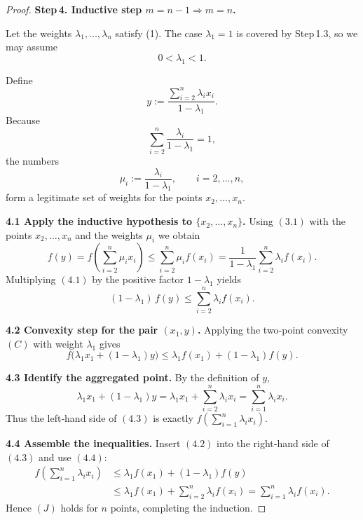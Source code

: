 \begin{proof}
\bigskip

\textbf{Step 4. Inductive step \(m=n-1\Longrightarrow m=n\).}  

Let the weights \(\lambda_{1},\dots ,\lambda_{n}\) satisfy (1).  
The case \(\lambda_{1}=1\) is covered by Step 1.3, so we may assume
\[
0<\lambda_{1}<1 .
\]

Define
\[
y:=\frac{\displaystyle\sum_{i=2}^{n}\lambda_{i}x_{i}}{1-\lambda_{1}} .
\]
Because
\[
\sum_{i=2}^{n}\frac{\lambda_{i}}{1-\lambda_{1}}=1,
\]
the numbers
\[
\mu_{i}:=\frac{\lambda_{i}}{1-\lambda_{1}},\qquad i=2,\dots ,n,
\]
form a legitimate set of weights for the points \(x_{2},\dots ,x_{n}\).

\medskip

\textbf{4.1 Apply the inductive hypothesis to \(\{x_{2},\dots ,x_{n}\}\).}  
Using \((3.1)\) with the points \(x_{2},\dots ,x_{n}\) and the weights \(\mu_{i}\) we obtain
\begin{equation*}
f(y)=f\!\left(\sum_{i=2}^{n}\mu_{i}x_{i}\right)
\le \sum_{i=2}^{n}\mu_{i}f(x_{i})
 =\frac{1}{1-\lambda_{1}}\sum_{i=2}^{n}\lambda_{i}f(x_{i}). \tag{4.1}
\end{equation*}
Multiplying \((4.1)\) by the positive factor \(1-\lambda_{1}\) yields
\begin{equation*}
(1-\lambda_{1})\,f(y)\le\sum_{i=2}^{n}\lambda_{i}f(x_{i}). \tag{4.2}
\end{equation*}

\medskip

\textbf{4.2 Convexity step for the pair \((x_{1},y)\).}  
Applying the two‑point convexity \((C)\) with weight \(\lambda_{1}\) gives
\begin{equation*}
f\bigl(\lambda_{1}x_{1}+(1-\lambda_{1})y\bigr)
\le \lambda_{1}f(x_{1})+(1-\lambda_{1})f(y). \tag{4.3}
\end{equation*}

\medskip

\textbf{4.3 Identify the aggregated point.}  
By the definition of \(y\),
\begin{equation*}
\lambda_{1}x_{1}+(1-\lambda_{1})y
=\lambda_{1}x_{1}+\sum_{i=2}^{n}\lambda_{i}x_{i}
=\sum_{i=1}^{n}\lambda_{i}x_{i}. \tag{4.4}
\end{equation*}
Thus the left‑hand side of \((4.3)\) is exactly
\(f\!\left(\sum_{i=1}^{n}\lambda_{i}x_{i}\right)\).

\medskip

\textbf{4.4 Assemble the inequalities.}  
Insert \((4.2)\) into the right‑hand side of \((4.3)\) and use \((4.4)\):
\begin{align*}
f\!\left(\sum_{i=1}^{n}\lambda_{i}x_{i}\right)
&\le \lambda_{1}f(x_{1})+(1-\lambda_{1})f(y) \\
&\le \lambda_{1}f(x_{1})+\sum_{i=2}^{n}\lambda_{i}f(x_{i})
   =\sum_{i=1}^{n}\lambda_{i}f(x_{i}).
\end{align*}
Hence \((J)\) holds for \(n\) points, completing the induction.


\end{proof}
